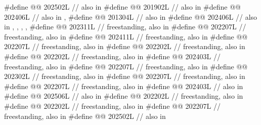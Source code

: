 \begin{codeblock}
#define @@                       202502L // also in 
#define @@             201902L // also in 
#define @@                             202406L // also in , 
#define @@                  201304L // also in 
#define @@                            202406L
  // also in , , , , 
#define @@                   202311L // freestanding, also in 
#define @@                  202207L // freestanding, also in 
#define @@               202411L // freestanding, also in 
#define @@          202207L // freestanding, also in 
#define @@                      202202L // freestanding, also in 
#define @@                   202202L // freestanding, also in 
#define @@                     202403L // freestanding, also in 
#define @@                   202207L // freestanding, also in 
#define @@                  202302L // freestanding, also in 
#define @@                  202207L // freestanding, also in 
#define @@                       202207L // freestanding, also in 
#define @@            202403L // also in 
#define @@                    202506L // also in 
#define @@                       202202L // freestanding, also in 
#define @@                  202202L // freestanding, also in 
#define @@                     202207L // freestanding, also in 
#define @@               202502L // also in 

\end{codeblock}
